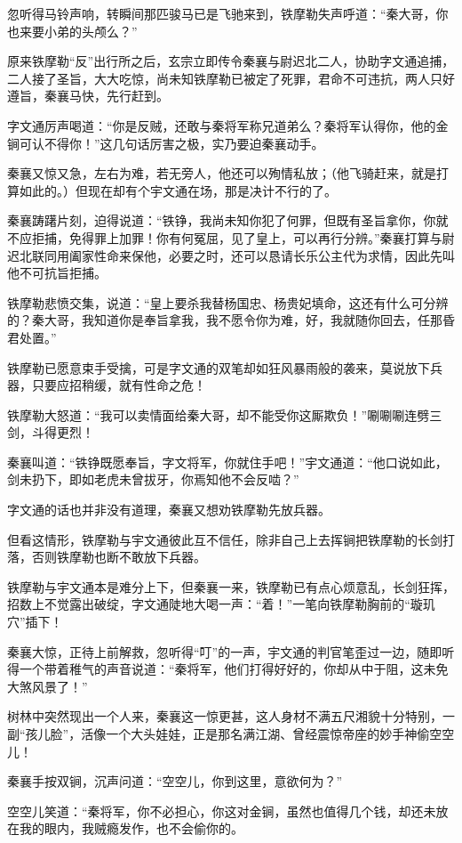\documentclass[12pt,oneside]{book}
\begin{document}
忽听得马铃声响，转瞬间那匹骏马已是飞驰来到，铁摩勒失声呼道：``秦大哥，你也来要小弟的头颅么？''

原来铁摩勒``反''出行所之后，玄宗立即传令秦襄与尉迟北二人，协助字文通追捕，二人接了圣旨，大大吃惊，尚未知铁摩勒已被定了死罪，君命不可违抗，两人只好遵旨，秦襄马快，先行赶到。

字文通厉声喝道：``你是反贼，还敢与秦将军称兄道弟么？秦将军认得你，他的金锏可认不得你！''这几句话厉害之极，实乃要迫秦襄动手。

秦襄又惊又急，左右为难，若无旁人，他还可以殉情私放；（他飞骑赶来，就是打算如此的。）但现在却有个宇文通在场，那是决计不行的了。

秦襄踌躇片刻，迫得说道：``铁铮，我尚未知你犯了何罪，但既有圣旨拿你，你就不应拒捕，免得罪上加罪！你有何冤屈，见了皇上，可以再行分辨。''秦襄打算与尉迟北联同用阖家性命来保他，必要之时，还可以恳请长乐公主代为求情，因此先叫他不可抗旨拒捕。

铁摩勒悲愤交集，说道：``皇上要杀我替杨国忠、杨贵妃填命，这还有什么可分辨的？秦大哥，我知道你是奉旨拿我，我不愿令你为难，好，我就随你回去，任那昏君处置。''

铁摩勒已愿意束手受擒，可是字文通的双笔却如狂风暴雨般的袭来，莫说放下兵器，只要应招稍缓，就有性命之危！

铁摩勒大怒道：``我可以卖情面给秦大哥，却不能受你这厮欺负！''唰唰唰连劈三剑，斗得更烈！

秦襄叫道：``铁铮既愿奉旨，字文将军，你就住手吧！''宇文通道：``他口说如此，剑未扔下，即如老虎未曾拔牙，你焉知他不会反啮？''

字文通的话也并非没有道理，秦襄又想劝铁摩勒先放兵器。

但看这情形，铁摩勒与宇文通彼此互不信任，除非自己上去挥锏把铁摩勒的长剑打落，否则铁摩勒也断不敢放下兵器。

铁摩勒与宇文通本是难分上下，但秦襄一来，铁摩勒已有点心烦意乱，长剑狂挥，招数上不觉露出破绽，字文通陡地大喝一声：``着！''一笔向铁摩勒胸前的``璇玑穴''插下！

秦襄大惊，正待上前解救，忽听得``叮''的一声，宇文通的判官笔歪过一边，随即听得一个带着稚气的声音说道：``秦将军，他们打得好好的，你却从中于阻，这未免大煞风景了！''

树林中突然现出一个人来，秦襄这一惊更甚，这人身材不满五尺湘貌十分特别，一副``孩儿脸''，活像一个大头娃娃，正是那名满江湖、曾经震惊帝座的妙手神偷空空儿！

秦襄手按双锏，沉声问道：``空空儿，你到这里，意欲何为？''

空空儿笑道：``秦将军，你不必担心，你这对金锏，虽然也值得几个钱，却还未放在我的眼内，我贼瘾发作，也不会偷你的。
\end{document}
